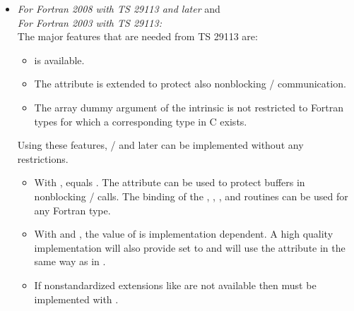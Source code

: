 \begin{itemize}
\begin{itemize}
       to \emph{try to} protect buffers in nonblocking \MPI/ calls,
       but the protection can work only if the compiler
       is able to protect asynchronous Fortran I/O and makes no difference
       between such asynchronous Fortran I/O and \MPI/ communication.
   \item
       The  binding of the
       , ,
       , and
        routines
       can be used only for Fortran types that are C compatible.
   \item
       The same restriction as for Fortran 90 applies if
       nonstandardized extensions like 
       are not available.
   \end{itemize}
\item
  \emph{For Fortran 2008 with TS 29113 and later} and \\
  \emph{For Fortran 2003 with TS 29113:} \\
  The major features that are needed from TS 29113 are:
   \begin{itemize}
   \item {} is available.
   \item The  attribute is extended to protect also
         nonblocking \MPI/ communication.
   \item The array dummy argument of the  intrinsic
          is not restricted to Fortran types for which
         a corresponding type in C exists.
   \end{itemize}
  Using these features, \MPIIIIDOTO/ and later can be implemented without any restrictions.
   \begin{itemize}
   \item
     With ,
        equals .
       The  attribute can be used
       to protect buffers in nonblocking \MPI/ calls.
       The  binding of the
       , ,
       , and
        routines
       can be used for any Fortran type.
   \item
       With  and ,
       the value of  is implementation dependent.
       A high quality implementation will also provide
        set to 
       and will use the 
       attribute in the same way as in .
   \item
       If nonstandardized extensions like 
       are not available then  must be implemented with
       .
   \end{itemize}
\end{itemize}

